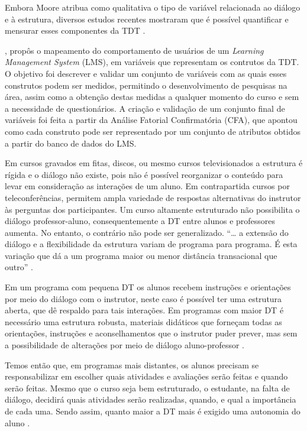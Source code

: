 Embora Moore atribua como qualitativa o tipo de variável relacionada ao diálogo
e à estrutura, diversos estudos recentes mostraram que é possível quantificar e
mensurar esses componentes da TDT
\cite{zhang2003transactional,horzum2011developing,paul2015revisiting,
ramos2016abordagem}.

, propôs o mapeamento do comportamento de
usuários de um \textit{Learning Management System} (LMS), em variáveis que
representam os contrutos da TDT. O objetivo foi descrever e validar um conjunto
de variáveis com as quais esses construtos podem ser medidos, permitindo o
desenvolvimento de pesquisas na área, assim como a obtenção destas medidas a
qualquer momento do curso e sem a necessidade de questionários. A criação e
validação de um conjunto final de variáveis foi feita a partir da Análise
Fatorial Confirmatória (CFA), que apontou como cada construto pode ser
representado por um conjunto de atributos obtidos a partir do banco de dados do
LMS.

Em cursos gravados em fitas, discos, ou mesmo cursos televisionados a estrutura
é rígida e o diálogo não existe, pois não é possível reorganizar o conteúdo para
levar em consideração as interações de um aluno. Em contrapartida cursos por
teleconferências, permitem ampla variedade de respostas alternativas do
instrutor às perguntas dos participantes. Um curso altamente estruturado não
possibilita o diálogo professor-aluno, consequentemente a DT entre alunos e
professores aumenta. No entanto, o contrário não pode ser generalizado. ``\ldots
a extensão do diálogo e a flexibilidade da estrutura variam de programa para
programa. É esta variação que dá a um programa maior ou menor distância
transacional que outro'' \cite{moore2008teoria}.

Em um programa com pequena DT os alunos recebem instruções e orientações por
meio do diálogo com o instrutor, neste caso é possível ter uma estrutura aberta,
que dê respaldo para tais interações. Em programas com maior DT é necessário uma
estrutura robusta, materiais didáticos que forneçam todas as orientações,
instruções e aconselhamentos que o instrutor puder prever, mas sem a
possibilidade de alterações por meio de diálogo aluno-professor
\cite{moore2008teoria}.

Temos então que, em programas mais distantes, os alunos precisam se
responsabilizar em escolher quais atividades e avaliações serão feitas e quando
serão feitas. Mesmo que o curso seja bem estruturado, o estudante, na falta de
diálogo, decidirá quais atividades serão realizadas, quando, e qual a
importância de cada uma. Sendo assim, quanto maior a DT mais é exigido uma
autonomia do aluno \cite{moore2008teoria}.


